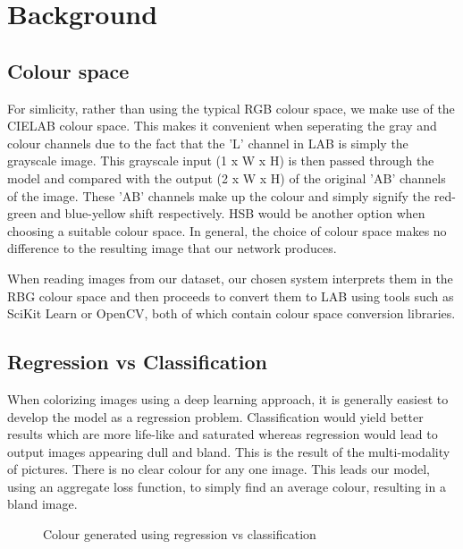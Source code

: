 \documentclass[conference]{IEEEtran}
\begin{document}
\section{Background}

\subsection{Colour space}

For simlicity, rather than using the typical RGB colour space, we make use of the CIELAB colour space. This makes it convenient when seperating the gray and colour channels due to the fact that the 'L' channel in LAB is simply the grayscale image. This grayscale input (1 x W x H) is then passed through the model and compared with the output (2 x W x H) of the original 'AB' channels of the image. These 'AB' channels make up the colour and simply signify the red-green and blue-yellow shift respectively. HSB would be another option when choosing a suitable colour space. In general, the choice of colour space makes no difference to the resulting image that our network produces.

When reading images from our dataset, our chosen system interprets them in the RBG colour space and then proceeds to convert them to LAB using tools such as SciKit Learn or OpenCV, both of which contain colour space conversion libraries. 

\subsection{Regression vs Classification}

When colorizing images using a deep learning approach, it is generally easiest to develop the model as a regression problem. Classification would yield better results which are more life-like and saturated whereas regression would lead to output images appearing dull and bland. This is the result of the multi-modality of pictures. There is no clear colour for any one image. This leads our model, using an aggregate loss function, to simply find an average colour, resulting in a bland image.

\begin{figure}[h]
    \centering
    \qquad
    \caption{Colour generated using regression vs classification \cite{zhang2016colorful}}%
    \label{fig:reg_vs_class}
\end{figure}
\end{document}
